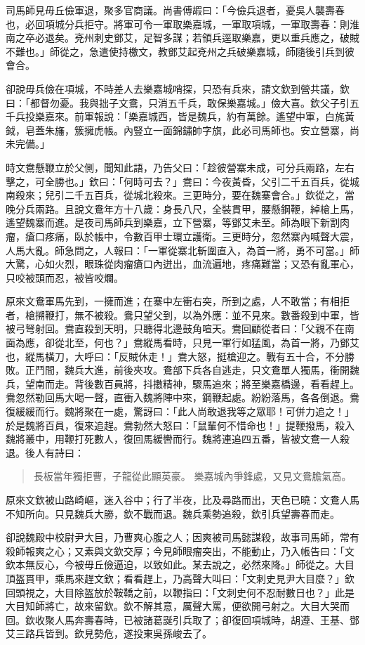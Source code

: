 司馬師見毋丘儉軍退，聚多官商議。尚書傅嘏曰：「今儉兵退者，憂吳人襲壽春也，必回項城分兵拒守。將軍可令一軍取樂嘉城，一軍取項城，一軍取壽春：則淮南之卒必退矣。兗州刺史鄧艾，足智多謀；若領兵逕取樂嘉，更以重兵應之，破賊不難也。」師從之，急遣使持檄文，教鄧艾起兗州之兵破樂嘉城，師隨後引兵到彼會合。

卻說毋兵儉在項城，不時差人去樂嘉城哨探，只恐有兵來，請文欽到營共議，欽曰：「都督勿憂。我與拙子文鴦，只消五千兵，敢保樂嘉城。」儉大喜。欽父子引五千兵投樂嘉來。前軍報說：「樂嘉城西，皆是魏兵，約有萬餘。遙望中軍，白旄黃鉞，皂蓋朱旛，簇擁虎帳。內豎立一面錦鏽帥字旗，此必司馬師也。安立營寨，尚未完備。」

時文鴦懸鞭立於父側，聞知此語，乃告父曰：「趁彼營寨未成，可分兵兩路，左右擊之，可全勝也。」欽曰：「何時可去？」鴦曰：今夜黃昏，父引二千五百兵，從城南殺來；兒引二千五百兵，從城北殺來。三更時分，要在魏寨會合。」欽從之，當晚分兵兩路。且說文鴦年方十八歲：身長八尺，全裝貫甲，腰懸鋼鞭，綽槍上馬，遙望魏寨而進。是夜司馬師兵到樂嘉，立下營寨，等鄧艾未至。師為眼下新割肉瘤，瘡口疼痛，臥於帳中，令數百甲士環立護衛。三更時分，忽然寨內喊聲大震，人馬大亂。師急問之，人報曰：「一軍從寨北斬圍直入，為首一將，勇不可當。」師大驚，心如火烈，眼珠從肉瘤瘡口內迸出，血流遍地，疼痛難當；又恐有亂軍心，只咬被頭而忍，被皆咬爛。

原來文鴦軍馬先到，一擁而進；在寨中左衝右突，所到之處，人不敢當；有相拒者，槍搠鞭打，無不被殺。鴦只望父到，以為外應：並不見來。數番殺到中軍，皆被弓弩射回。鴦直殺到天明，只聽得北邊鼓角喧天。鴦回顧從者曰：「父親不在南面為應，卻從北至，何也？」鴦縱馬看時，只見一軍行如猛風，為首一將，乃鄧艾也，縱馬橫刀，大呼曰：「反賊休走！」鴦大怒，挺槍迎之。戰有五十合，不分勝敗。正鬥間，魏兵大進，前後夾攻。鴦部下兵各自逃走，只文鴦單人獨馬，衝開魏兵，望南而走。背後數百員將，抖擻精神，驟馬追來；將至樂嘉橋邊，看看趕上。鴦忽然勒回馬大喝一聲，直衝入魏將陣中來，鋼鞭起處。紛紛落馬，各各倒退。鴦復緩緩而行。魏將聚在一處，驚訝曰：「此人尚敢退我等之眾耶！可併力追之！」於是魏將百員，復來追趕。鴦勃然大怒曰：「鼠輩何不惜命也！」提鞭撥馬，殺入魏將叢中，用鞭打死數人，復回馬緩轡而行。魏將連追四五番，皆被文鴦一人殺退。後人有詩曰：

\begin{quote}
長板當年獨拒曹，子龍從此顯英豪。
樂嘉城內爭鋒處，又見文鴦膽氣高。
\end{quote}

原來文欽被山路崎嶇，迷入谷中；行了半夜，比及尋路而出，天色已曉：文鴦人馬不知所向。只見魏兵大勝，欽不戰而退。魏兵乘勢追殺，欽引兵望壽春而走。

卻說魏殿中校尉尹大目，乃曹爽心腹之人；因爽被司馬懿謀殺，故事司馬師，常有殺師報爽之心；又素與文欽交厚；今見師眼瘤突出，不能動止，乃入帳告曰：「文欽本無反心，今被毋丘儉逼迫，以致如此。某去說之，必然來降。」師從之。大目頂盔貫甲，乘馬來趕文欽；看看趕上，乃高聲大叫曰：「文刺史見尹大目麼？」欽回頭視之，大目除盔放於鞍鞽之前，以鞭指曰：「文刺史何不忍耐數日也？」此是大目知師將亡，故來留欽。欽不解其意，厲聲大罵，便欲開弓射之。大目大哭而回。欽收聚人馬奔壽春時，已被諸葛誕引兵取了；卻復回項城時，胡遵、王基、鄧艾三路兵皆到。欽見勢危，遂投東吳孫峻去了。

